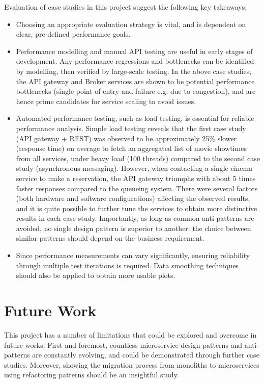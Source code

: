 Evaluation of case studies in this project suggest the following key takeaways:
\begin{itemize}
  \item Choosing an appropriate evaluation strategy is vital, and is dependent on clear, pre-defined performance goals.
  \item Performance modelling and manual API testing are useful in early stages of development. Any performance regressions and bottlenecks can be identified by modelling, then verified by large-scale testing. In the above case studies, the API gateway and Broker services are shown to be potential performance bottlenecks (single point of entry and failure e.g. due to congestion), and are hence prime candidates for service scaling to avoid issues.
  \item Automated performance testing, such as load testing, is essential for reliable performance analysis. Simple load testing reveals that the first case study (API gateway + REST) was observed to be approximately 25\% slower (response time) on average to fetch an aggregated list of movie showtimes from all services,  under heavy load (100 threads) compared to the second case study (asynchronous messaging). However, when contacting a single cinema service to make a reservation, the API gateway triumphs with about 5 times faster responses compared to the queueing system. There were several factors (both hardware and software configurations) affecting the observed results, and it is quite possible to further tune the services to obtain more distinctive results in each case study. Importantly, as long as common anti-patterns are avoided, no single design pattern is superior to another: the choice between similar patterns should depend on the business requirement.
  \item Since performance measurements can vary significantly, ensuring reliability through multiple test iterations is required. Data smoothing techniques should also be applied to obtain more usable plots.
\end{itemize}

\section{Future Work}

This project has a number of limitations that could be explored and overcome in future works. First and foremost, countless microservice design patterns and anti-patterns are constantly evolving, and could be demonstrated through further case studies. Moreover, showing the migration process from monoliths to microservices using refactoring patterns should be an insightful study.

